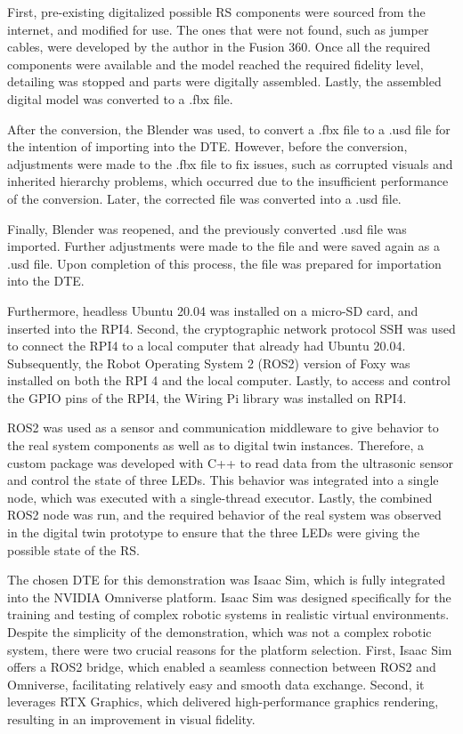 \documentclass[conference]{IEEEtran}
\begin{document}
    First, pre-existing digitalized possible RS components were sourced from the internet, and modified for use. The ones that were not found, such as jumper cables, were developed by the author 
    in the Fusion 360. Once all the required components were available and the model reached the required fidelity level, detailing was stopped and parts were digitally assembled. 
    Lastly, the assembled digital model was converted to a .fbx file.

    After the conversion, the Blender was used, to convert a .fbx file to a .usd file for the intention of importing into the DTE. However, before the conversion, 
    adjustments were made to the .fbx file to fix issues, such as corrupted visuals and inherited hierarchy problems, which occurred due to the insufficient performance of the conversion. 
    Later, the corrected file was converted into a .usd file. 

    Finally, Blender was reopened, and the previously converted .usd file was imported. Further adjustments were made to the file and were saved again as a .usd file. Upon completion of this process, 
    the file was prepared for importation into the DTE.

    Furthermore, headless Ubuntu 20.04 was installed on a micro-SD card, and inserted into the RPI4. Second, the cryptographic network protocol SSH was used to connect the RPI4 to a local computer that already had Ubuntu 20.04.
     Subsequently, the Robot Operating System 2 (ROS2) version of Foxy was installed on both the RPI 4 and the local computer. 
     Lastly, to access and control the GPIO pins of the RPI4, the Wiring Pi library was installed on RPI4.

    ROS2 was used as a sensor and communication middleware to give behavior to the real system components as well as to digital twin instances. 
    Therefore, a custom package was developed with C++  to read data from the ultrasonic sensor and control the state of three LEDs. This behavior was integrated into a single node, which was executed with a single-thread executor. Lastly, the combined ROS2 node was run, and the required behavior of the real system was observed in the digital twin prototype to ensure that the three LEDs were giving the possible state of the RS.

    The chosen DTE for this demonstration was Isaac Sim, which is fully integrated into the NVIDIA Omniverse platform. Isaac Sim was designed specifically for the training and testing of complex robotic 
    systems in realistic virtual environments. Despite the simplicity of the demonstration, which was not a complex robotic system, there were two crucial reasons for the platform selection. 
    First, Isaac Sim offers a ROS2 bridge, which enabled a seamless connection between ROS2 and Omniverse, facilitating relatively easy and smooth data exchange. Second, it leverages RTX Graphics, 
    which delivered high-performance graphics rendering, resulting in an improvement in visual fidelity. 
\end{document}
